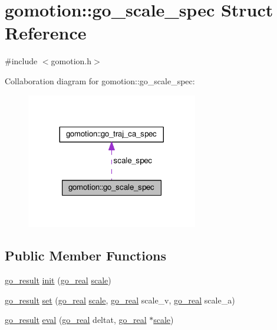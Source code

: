 \hypertarget{structgomotion_1_1go__scale__spec}{\section{gomotion\-:\-:go\-\_\-scale\-\_\-spec Struct Reference}
\label{structgomotion_1_1go__scale__spec}
}


{\ttfamily \#include $<$gomotion.\-h$>$}



Collaboration diagram for gomotion\-:\-:go\-\_\-scale\-\_\-spec\-:\nopagebreak
\begin{figure}[H]
\begin{center}
\leavevmode
\includegraphics[width=212pt]{d0/dd3/structgomotion_1_1go__scale__spec__coll__graph}
\end{center}
\end{figure}
\subsection*{Public Member Functions}
\begin{DoxyCompactItemize}
\item 
\hyperlink{gotypes_8h_a55d48b38cd959f63c7e8db8337a9792a}{go\-\_\-result} \hyperlink{structgomotion_1_1go__scale__spec_ab10fecb573317c67528eb4d370705129}{init} (\hyperlink{gotypes_8h_afd666a2393eebd71ee455846ac9def9b}{go\-\_\-real} \hyperlink{structgomotion_1_1go__scale__spec_a592f5bd1c5d775d30e25b798900a2c30}{scale})
\item 
\hyperlink{gotypes_8h_a55d48b38cd959f63c7e8db8337a9792a}{go\-\_\-result} \hyperlink{structgomotion_1_1go__scale__spec_af98067c5057e4a27be45c932d40b1ee3}{set} (\hyperlink{gotypes_8h_afd666a2393eebd71ee455846ac9def9b}{go\-\_\-real} \hyperlink{structgomotion_1_1go__scale__spec_a592f5bd1c5d775d30e25b798900a2c30}{scale}, \hyperlink{gotypes_8h_afd666a2393eebd71ee455846ac9def9b}{go\-\_\-real} scale\-\_\-v, \hyperlink{gotypes_8h_afd666a2393eebd71ee455846ac9def9b}{go\-\_\-real} scale\-\_\-a)
\item 
\hyperlink{gotypes_8h_a55d48b38cd959f63c7e8db8337a9792a}{go\-\_\-result} \hyperlink{structgomotion_1_1go__scale__spec_a8eaf5f40d5b5ee430ae70a1f4fbcff1e}{eval} (\hyperlink{gotypes_8h_afd666a2393eebd71ee455846ac9def9b}{go\-\_\-real} deltat, \hyperlink{gotypes_8h_afd666a2393eebd71ee455846ac9def9b}{go\-\_\-real} $\ast$\hyperlink{structgomotion_1_1go__scale__spec_a592f5bd1c5d775d30e25b798900a2c30}{scale})
\end{DoxyCompactItemize}
